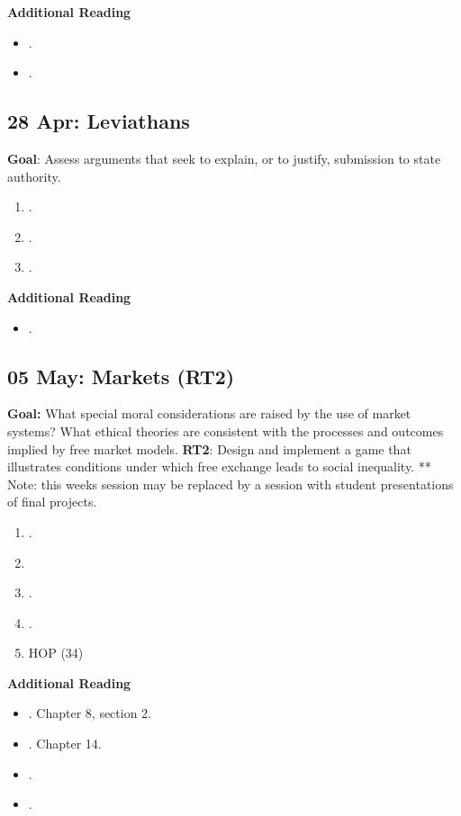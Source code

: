 \documentclass[11pt]{article}
\begin{document}
\textbf{Additional Reading}
\begin{itemize}
\item {}.
\item {}.
\end{itemize}


\subsection{28 Apr: Leviathans}
\textbf{Goal}: Assess arguments that seek to explain, or to justify, submission to state authority. 
\begin{enumerate}
\item {}. {\color{red}{The state}}
\item {}.
\item {}.
\end{enumerate}

\textbf{Additional Reading}
\begin{itemize}
\item {}.
\end{itemize}


\subsection{05 May: Markets (RT2)}
\textbf{Goal:} What special moral considerations are raised by the use of market systems? What ethical theories are consistent with the processes and outcomes implied by free market models. \textbf{RT2}: Design and implement a game that illustrates conditions under which free exchange leads to social inequality.
** Note: this weeks session may be replaced by a session with student presentations of final projects.  
\begin{enumerate}
\item {}.
\item {}
\item {}.
\item {}.
\item HOP (34)
\end{enumerate}

\textbf{Additional Reading}
\begin{itemize}
\item {}. Chapter 8, section 2.
\item {}. Chapter 14.
\item {}.
\item {}.
\end{itemize}



\newpage
{}
%


\end{document}
